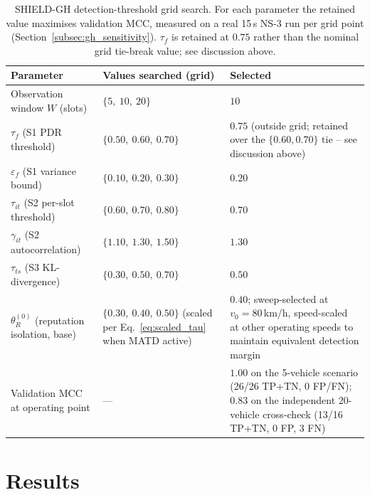 \documentclass[12pt, a4paper]{report}
\begin{document}
\begin{table}[H]
    \centering
    \small
    \caption{SHIELD-GH detection-threshold grid search. For each parameter the
        retained value maximises validation MCC, measured on a real 15\,s
        NS-3 run per grid point (Section~\ref{subsec:gh_sensitivity}).
        $\tau_f$ is retained at $0.75$ rather than the nominal grid
        tie-break value; see discussion above.}
    \label{tab:gh_sensitivity}
    \begin{tabular}{| m{3.8cm} | m{5.2cm} | m{2.8cm} |}
        \hline
        \textbf{Parameter} & \textbf{Values searched (grid)} & \textbf{Selected} \\
        \hline
        Observation window $W$ (slots) & $\{5,\ 10,\ 20\}$ & $10$ \\
        \hline
        $\tau_f$ (S1 PDR threshold) & $\{0.50,\ 0.60,\ 0.70\}$ & $0.75$ (outside grid; retained over the $\{0.60,0.70\}$ tie -- see discussion above) \\
        \hline
        $\varepsilon_f$ (S1 variance bound) & $\{0.10,\ 0.20,\ 0.30\}$ & $0.20$ \\
        \hline
        $\tau_{it}$ (S2 per-slot threshold) & $\{0.60,\ 0.70,\ 0.80\}$ & $0.70$ \\
        \hline
        $\gamma_{it}$ (S2 autocorrelation) & $\{1.10,\ 1.30,\ 1.50\}$ & $1.30$ \\
        \hline
        $\tau_{ts}$ (S3 KL-divergence) & $\{0.30,\ 0.50,\ 0.70\}$ & $0.50$ \\
        \hline
        $\theta_R^{(0)}$ (reputation isolation, base) & $\{0.30,\ 0.40,\ 0.50\}$ (scaled per Eq.~\eqref{eq:scaled_tau} when MATD active) & $0.40$; sweep-selected at $v_0=80$\,km/h, speed-scaled at other operating speeds to maintain equivalent detection margin \\
        \hline
        Validation MCC at operating point & --- & $1.00$ on the 5-vehicle scenario (26/26 TP+TN, 0 FP/FN); $0.83$ on the independent 20-vehicle cross-check (13/16 TP+TN, 0 FP, 3 FN) \\
        \hline
    \end{tabular}
\end{table}










\chapter{Results}
\label{chap:results}
\end{document}
